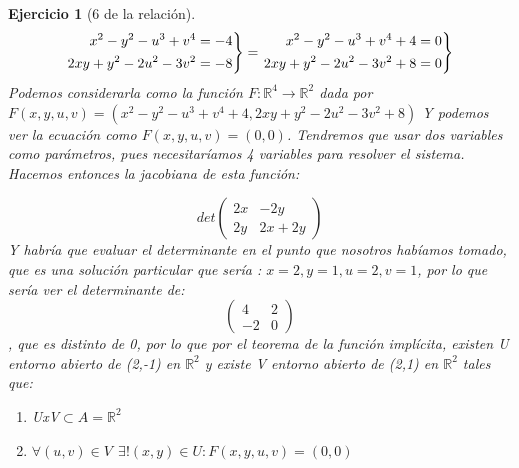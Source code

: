 \documentclass[11pt, a4paper, titlepage]{article}
\newcommand{\R}{\mathbb{R}}
\theoremstyle{exercise-style}
\newtheorem*{ejer}{Ejercicio}
\theoremstyle{theorem-style}
\newenvironment{rcases}
  {\left.\begin{aligned}}
  {\end{aligned}\right\rbrace}
\begin{document}
\begin{ejer}[6 de la relación]

\[
\begin{rcases}
	x^2 - y^2 -u^3 +v^4 = -4\\
	2xy + y^2 -2u^2 -3v^2 = -8
\end{rcases} = \begin{rcases}
	x^2 - y^2 -u^3 +v^4  + 4= 0\\
	2xy + y^2 -2u^2 -3v^2  + 8=  0
\end{rcases}
\]
	Podemos considerarla como la función $F: \R^4 \to \R^2$ dada por\\
	 $F(x,y,u,v) = (x^2 - y^2 -u^3 +v^4  + 4,2xy + y^2 -2u^2 -3v^2  + 8)$
	 Y podemos ver la ecuación como $F(x,y,u,v) = (0,0)$.
	 Tendremos que usar dos variables como parámetros, pues necesitaríamos 4 variables para resolver el sistema.
	 Hacemos entonces la jacobiana de esta función:
	 
	 \[
	 det\begin{pmatrix}
 2x & -2y \\
 2y & 2x+2y 
\end{pmatrix} 
	 \]
	 Y habría que evaluar el determinante en el punto que nosotros habíamos tomado, que es una solución particular que sería : $x=2, y = 1,u = 2,v = 1$, por lo que sería ver el determinante de:
	 \[
	 \begin{pmatrix}
 4 & 2 \\
 -2 & 0 
\end{pmatrix} 
	 \]
, que es distinto de 0, por lo que por el teorema de la función implícita, existen U entorno abierto de (2,-1) en $\R^2$ y existe V entorno abierto de (2,1) en $\R^2$ tales que:
\begin{enumerate}
	\item UxV$\subset A = \R^2$
	\item $\forall(u,v) \in V \ \ \exists ! (x,y) \in U : F(x,y,u,v) = (0,0)$
\end{enumerate}
\end{ejer}
\end{document}

